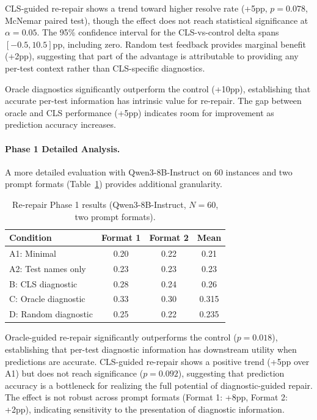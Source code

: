 \documentclass[11pt]{article}
\begin{document}
CLS-guided re-repair shows a trend toward higher resolve rate (+5pp, $p=0.078$, McNemar paired test), though the effect does not reach statistical significance at $\alpha=0.05$. The 95\% confidence interval for the CLS-vs-control delta spans $[-0.5, 10.5]$pp, including zero. Random test feedback provides marginal benefit (+2pp), suggesting that part of the advantage is attributable to providing any per-test context rather than CLS-specific diagnostics.

Oracle diagnostics significantly outperform the control (+10pp), establishing that accurate per-test information has intrinsic value for re-repair. The gap between oracle and CLS performance (+5pp) indicates room for improvement as prediction accuracy increases.

\paragraph{Phase 1 Detailed Analysis.}
A more detailed evaluation with Qwen3-8B-Instruct on 60 instances and two prompt formats (Table~\ref{tab:rerepair-phase1}) provides additional granularity.

\begin{table}[t]
\centering
\caption{Re-repair Phase 1 results (Qwen3-8B-Instruct, $N=60$, two prompt formats).}
\label{tab:rerepair-phase1}
\begin{tabular}{lccc}
\toprule
Condition & Format 1 & Format 2 & Mean \\
\midrule
A1: Minimal & 0.20 & 0.22 & 0.21 \\
A2: Test names only & 0.23 & 0.23 & 0.23 \\
B: CLS diagnostic & 0.28 & 0.24 & 0.26 \\
C: Oracle diagnostic & 0.33 & 0.30 & 0.315 \\
D: Random diagnostic & 0.25 & 0.22 & 0.235 \\
\bottomrule
\end{tabular}
\end{table}

Oracle-guided re-repair significantly outperforms the control ($p=0.018$), establishing that per-test diagnostic information has downstream utility when predictions are accurate. CLS-guided re-repair shows a positive trend (+5pp over A1) but does not reach significance ($p=0.092$), suggesting that prediction accuracy is a bottleneck for realizing the full potential of diagnostic-guided repair. The effect is not robust across prompt formats (Format 1: +8pp, Format 2: +2pp), indicating sensitivity to the presentation of diagnostic information.
\end{document}
